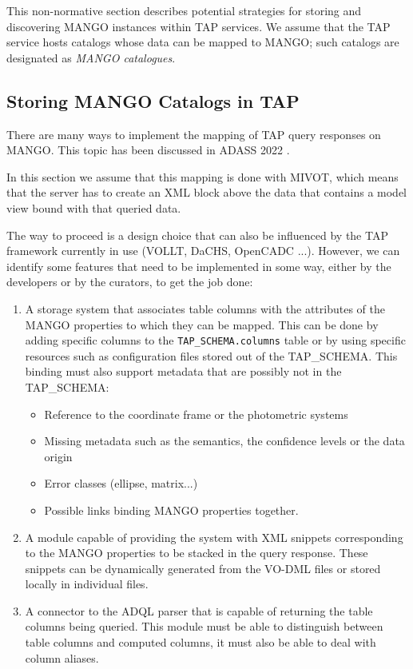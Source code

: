 This non-normative section describes potential strategies for
storing and discovering MANGO instances within TAP services.
We assume that the TAP service hosts catalogs whose data can be mapped to MANGO;
such catalogs are designated as \emph{MANGO catalogues}.

\subsection{Storing MANGO Catalogs in TAP}

There are many ways to implement the mapping of TAP query responses on MANGO.
This topic has been discussed in ADASS 2022 \citep{2024ASPC..535..259M}.

In this section we assume that this mapping is done with MIVOT, which means that the server has to create an 
XML block above the data that contains a model view bound with that queried data.

The way to proceed is a design choice that can also be influenced by the TAP 
framework currently in use (VOLLT, DaCHS, OpenCADC ...). 
However, we can identify some features that need to be implemented in some way, 
either by the developers or by the curators, to get the job done:

\begin{enumerate}
    \item A storage system that associates table columns with the attributes 
          of the MANGO properties to which they can be mapped. 
          This can be done by adding specific columns to the \texttt{TAP\_SCHEMA.columns} 
          table or by using specific resources such as configuration files stored out of the TAP\_SCHEMA.
          This binding must also support metadata that are possibly not in the TAP\_SCHEMA:
          \begin{itemize}
              \item Reference to the coordinate frame or the photometric systems
              \item Missing metadata such as the semantics, the confidence levels or the data origin
              \item Error classes (ellipse, matrix...)
              \item Possible links binding MANGO properties together.
          \end{itemize}
     \item A module capable of providing the system with XML snippets corresponding to the MANGO 
           properties to be stacked in the query response. These snippets can be 
           dynamically generated from the VO-DML files or stored locally in individual files.
     \item A connector to the ADQL parser that is capable of returning the table columns being queried.
           This module must be able to distinguish between table columns and computed columns,
           it must also be able to deal with column aliases.
\end{enumerate}

